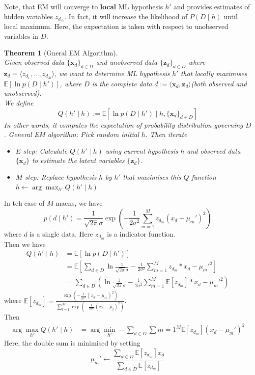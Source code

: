 \documentclass[12pt]{article}
\newtheorem{theorem}{Theorem}[section]
\theoremstyle{definition}
\begin{document}
Note, that EM will converge to \textbf{local} ML hypothesis $h'$ and provides estimates of hidden variables $z_{d_m}$. In fact, it will increase the likelihood of $P(D\mid h)$ until local maximum. Here, the expectation is taken with respect to unobserved variables in $D$. 
\begin{theorem}[Gneral EM Algorithm]
\hfill\\\normalfont Given observed data $\{\mathbf{x}_d\}_{d\in D}$ and unobserved data $\{\mathbf{z}_d\}_{d\in D}$ where $\mathbf{z}_d=\langle z_{d_1}, \ldots, z_{d_M}\rangle$, we want to determine ML hypothesis $h'$ that locally maximises $\mathbb{E}[\ln p(D\mid h')]$, where $D$ is the complete data $d:=\langle \mathbf{x}_d, \mathbf{z}_d\rangle$(both observed and unobserved).\\
We define 
\[
Q(h'\mid h):=\mathbb{E}[\ln p(D\mid h')\mid h, \{\mathbf{x}_d\}_{d\in D}]
\]
In other words, it computes the expectation of probability distribution governing $D$.
General EM algorithm: Pick random initial $h$. Then iterate
\begin{itemize}
	\item $E$ step: Calculate $Q(h' \mid h)$ using current hypothesis $h$ and observed data $\{\mathbf{x}_d\}$ to estimate the latent variables $\{\mathbf{z}_d\}$.
	\item $M$ step: Replace hypothesis $h$ by $h'$ that maximises this $Q$ function $h\leftarrow \arg\max_{h'} Q(h'\mid h)$
\end{itemize}
\end{theorem}
In teh case of $M$ maens, we have
\[
p(d\mid h') = \frac{1}{\sqrt{2\pi}\sigma}\exp(-\frac{1}{2\sigma^2}\sum_{m=1}^M z_{d_m}(x_d-\mu_m')^2)
\]
where $d$ is a single data. Here $z_{d_m}$ is a indicator function.\\
Then we have
\begin{align*}
Q(h'\mid h)&=\mathbb{E}[\ln p(D\mid h')]\\
&=\mathbb{E}[\sum_{d\in D} \ln \frac{1}{\sqrt{2\pi}\sigma}-\frac{1}{2\sigma^2}\sum_{m=1}^M z_{d_m}*x_d-\mu_m'^2]\\
&=\sum_{d\in D}(\ln \frac{1}{\sqrt{2\pi}\sigma} - \frac{1}{2\sigma^2}\sum_{m=1}^M \mathbb{E}[z_{d_m}]*x_d-\mu_m'^2)
\end{align*}
where $\mathbb{E}[z_{d_m}]=\frac{\exp(-\frac{1}{2\sigma^2}(x_d-\mu_m)^2)}{\sum_{l=1}^M \exp(-\frac{1}{2\sigma^2}(x_d-\mu_l)^2)}$.\\
Then 
\begin{align*}
\arg\max_{h'} Q(h'\mid h)&=\arg\min_{h'}-\sum_{d\in D}\sum{m=1}^M \mathbb{E}[z_{d_m}](x_d-\mu_m')^2
\end{align*}
Here, the double sum is minimised by setting
\[
\mu_m'\leftarrow \frac{\sum_{d\in D}\mathbb{E}[z_{d_m}]x_d}{\sum_{d\in D}\mathbb{E}[z_{d_m}]}
\]
\clearpage
\end{document}

